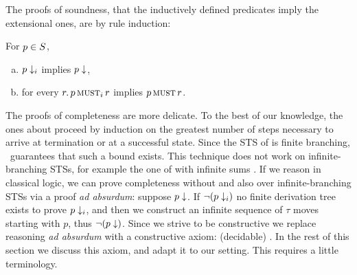 The proofs of soundness, \ie that the inductively defined predicates imply the extensional ones,
are by rule induction:
\begin{lemma}%
  \label{lem:intensional-implies-extensional}
  For $p \in S$,
  \begin{enumerate}[(a)]
  \item $p \downarrow_i $ implies $p \downarrow$,
  \item for every $r . \, p \operatorname{\textsc{must}}_i r$ implies $ p  \operatorname{\textsc{must}} r$.
  \end{enumerate}
\end{lemma}



The proofs of completeness are more delicate. To the best of our knowledge, the ones about \CCS \cite{TCD-CS-2010-13,phdbernardi}
proceed by induction on the greatest number of steps necessary to arrive at
termination or at a successful state. Since the STS of \sts{\CCS}{\st{\tau}} is
finite branching, \koenigslemma\ guarantees that such a bound exists. This
technique does not work on infinite-branching STSs, for example the one of \CCS
with infinite sums \cite{DBLP:journals/corr/BernardiH15}.
If we reason in classical logic, we can prove completeness without \koenigslemma
and also over infinite-branching STSs via a proof {\em ad absurdum}: suppose $p \downarrow$. If
$\lnot (p \downarrow_i)$ no finite derivation tree exists to prove $p \downarrow_i$, and
then we construct an infinite sequence of $\tau$ moves starting with $p$, thus $\lnot (p \downarrow)$.
Since we strive to be constructive we replace reasoning {\em ad absurdum} with a
constructive axiom: (decidable) \emph{\barinduction}. In the rest of this section we discuss this axiom, and adapt it to our \svrclt setting. This requires a little terminology.

\newcommand{\utree}{T_{\N}}



